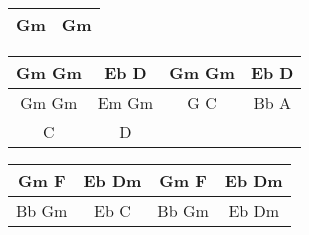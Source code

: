 \begin{tabular}{|c|c|}
    \hline
    Gm & Gm \\
    \hline
\end{tabular}


\begin{tabular}{|c|c|c|c|}
    \hline
    Gm Gm & Eb D  & Gm Gm & Eb D \\
    \hline
    Gm Gm & Em  Gm  & G C & Bb A \\
    \hline
        C & D & & \\
    \hline
\end{tabular}



\begin{tabular}{|c|c|c|c|}
    \hline
    Gm F &  Eb Dm & Gm F & Eb Dm \\
    \hline
    Bb Gm & Eb C & Bb Gm & Eb Dm \\
    \hline
\end{tabular}

